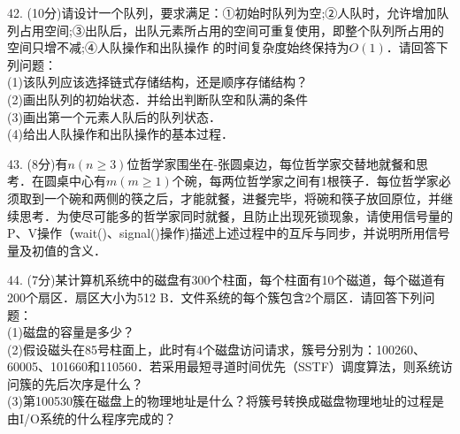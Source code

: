42. (10分)请设计一个队列，要求满足：①初始时队列为空;②人队时，允许增加队列占用空间;③出队后，出队元素所占用的空间可重复使用，即整个队列所占用的空间只增不减;④人队操作和出队操作
的时间复杂度始终保持为$O(1)$．请回答下列问题： \\
(1)该队列应该选择链式存储结构，还是顺序存储结构？ \\
(2)画出队列的初始状态．并给出判断队空和队满的条件 \\
(3)画出第一个元素人队后的队列状态． \\
(4)给出人队操作和出队操作的基本过程．

43. (8分)有$n(n\geqslant3)$位哲学家围坐在-张圆桌边，每位哲学家交替地就餐和思考．在圆桌中心有$m(m\geqslant1)$个碗，每两位哲学家之间有1根筷子．每位哲学家必须取到一个碗和两侧的筷之后，才能就餐，进餐完毕，将碗和筷子放回原位，并继续思考．为使尽可能多的哲学家同时就餐，且防止出现死锁现象，请使用信号量的P、V操作（wait()、signal()操作)描述上述过程中的互斥与同步，并说明所用信号量及初值的含义．

44. (7分)某计算机系统中的磁盘有300个柱面，每个柱面有10个磁道，每个磁道有200个扇区．扇区大小为512 B．文件系统的每个簇包含2个扇区．请回答下列问题： \\
(1)磁盘的容量是多少？ \\
(2)假设磁头在85号柱面上，此时有4个磁盘访问请求，簇号分别为：100260、60005、101660和110560．若采用最短寻道时间优先（SSTF）调度算法，则系统访问簇的先后次序是什么？ \\
(3)第100530簇在磁盘上的物理地址是什么？将簇号转换成磁盘物理地址的过程是由I/O系统的什么程序完成的？


